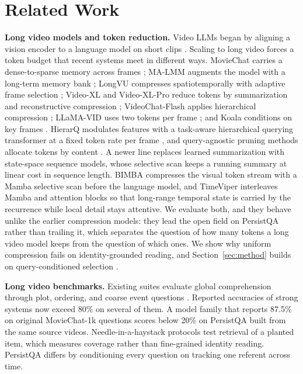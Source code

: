 \documentclass{article}
\newcommand{\bench}{PersistQA}
\begin{document}
\section{Related Work}
\textbf{Long video models and token reduction.} Video LLMs began by aligning a vision encoder to a language model on short clips \citep{videollava,videochat,videochatgpt,llavaonevision,qwen2vl,qwen25vl,internvl25,internvl3,minicpmv,mplugowl3}. Scaling to long video forces a token budget that recent systems meet in different ways. MovieChat carries a dense-to-sparse memory across frames \citep{moviechat}; MA-LMM augments the model with a long-term memory bank \citep{malmm}; LongVU compresses spatiotemporally with adaptive frame selection \citep{longvu}; Video-XL and Video-XL-Pro reduce tokens by summarization and reconstructive compression \citep{videoxl,videoxlpro}; VideoChat-Flash applies hierarchical compression \citep{videochatflash}; LLaMA-VID uses two tokens per frame \citep{llamavid}; and Koala conditions on key frames \citep{koala}. HierarQ modulates features with a task-aware hierarchical querying transformer at a fixed token rate per frame \citep{hierarq}, and query-agnostic pruning methods allocate tokens by content \citep{apt,tome,fastv,prumerge}. A newer line replaces learned summarization with state-space sequence models, whose selective scan keeps a running summary at linear cost in sequence length. BIMBA compresses the visual token stream with a Mamba selective scan before the language model, and TimeViper interleaves Mamba and attention blocks so that long-range temporal state is carried by the recurrence while local detail stays attentive. We evaluate both, and they behave unlike the earlier compression models: they lead the open field on \bench{} rather than trailing it, which separates the question of how many tokens a long video model keeps from the question of which ones. We show why uniform compression fails on identity-grounded reading, and Section~\ref{sec:method} builds on query-conditioned selection \citep{flexselect,apt}.

\textbf{Long video benchmarks.} Existing suites evaluate global comprehension through plot, ordering, and coarse event questions \citep{videomme,mlvu,lvbench,longvideobench,egoschema,mvbench,activitynetqa,perceptiontest}. Reported accuracies of strong systems now exceed 80\% on several of them. A model family that reports 87.5\% on original MovieChat-1k questions scores below 20\% on \bench{} built from the same source videos. Needle-in-a-haystack protocols test retrieval of a planted item, which measures coverage rather than fine-grained identity reading. \bench{} differs by conditioning every question on tracking one referent across time.
\end{document}
